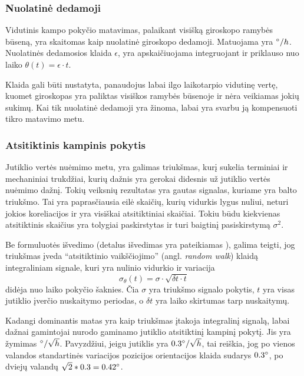 \subsubsection{Nuolatinė dedamoji}

Vidutinis kampo pokyčio matavimas, palaikant visišką giroskopo ramybės būseną, yra skaitomas kaip nuolatinė giroskopo dedamoji. Matuojama yra $\degree/h$. Nuolatinės dedamosios klaida $\epsilon$, yra apskaičiuojama integruojant ir priklauso nuo laiko $\theta(t) = \epsilon \cdot t$.

Klaida gali būti nustatyta, panaudojus labai ilgo laikotarpio vidutinę vertę, kuomet giroskopas yra paliktas visiškos ramybės būsenoje ir nėra veikiamas jokių sukimų. Kai tik nuolatinė dedamoji yra žinoma, labai yra svarbu ją kompensuoti tikro matavimo metu.

\subsubsection{Atsitiktinis kampinis pokytis}

Jutiklio vertės nuėmimo metu, yra galimas triukšmas, kurį sukelia terminiai ir mechaniniai trukdžiai, kurių dažnis yra gerokai didesnis už jutiklio vertės nuėmimo dažnį.
Tokių veiksnių rezultatas yra gautas signalas, kuriame yra balto triukšmo. Tai yra paprasčiausia eilė skaičių, kurių vidurkis lygus nuliui, neturi jokios koreliacijos ir yra visiškai atsitiktiniai skaičiai. Tokiu būdu kiekvienas atsitiktinis skaičius yra tolygiai paskirstytas ir turi baigtinį pasiskirstymą $\sigma^2$.

Be formuluotės išvedimo (detalus išvedimas yra pateikiamas \cite{woodman2007introduction}), galima teigti, jog triukšmas įveda ``atsitiktinio vaikščiojimo'' (angl. \textit{random walk}) klaidą integraliniam signale, kuri yra nulinio vidurkio ir variacija
\begin{equation}
    \sigma_{\theta} (t) = \sigma \cdot \sqrt{ \delta t \cdot t}
\end{equation}
didėja nuo laiko pokyčio šaknies. Čia $\sigma$ yra triukšmo signalo pokytis, $t$ yra visas jutiklio įverčio nuskaitymo periodas, o $\delta t$ yra laiko skirtumas tarp nuskaitymų.

Kadangi dominantis matas yra kaip triukšmas įtakoja integralinį signalą, labai dažnai gamintojai nurodo gaminamo jutiklio atsitiktinį kampinį pokytį. Jis yra žymimas $\degree/\sqrt{h}$. Pavyzdžiui, jeigu jutiklis yra $0.3\degree / \sqrt{h}$, tai reiškia, jog po vienos valandos standartinės variacijos pozicijos orientacijos klaida sudarys $0.3\degree$, po dviejų valandų $\sqrt{2} * 0.3 = 0.42 \degree$.

